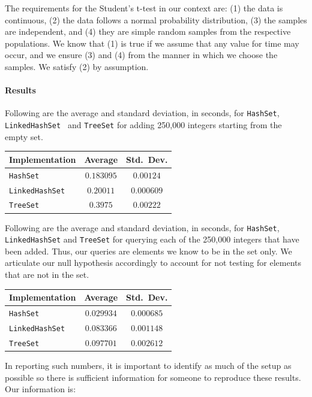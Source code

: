The requirements for the Student's t-test in our context
are: (1) the data is continuous, (2) the data follows a normal
probability distribution, (3) the samples are independent, and
(4) they are simple random samples from the respective populations.
We know that (1) is true if we assume that any value for time may
occur, and we ensure (3) and (4) from the
manner in which we choose the samples. We satisfy (2) by
assumption.

\paragraph{Results} Following are the average and standard
deviation, in seconds, for \texttt{HashSet}, \texttt{LinkedHashSet }
and \texttt{TreeSet} for
adding 250,000 integers starting from the empty set.
\begin{center}
    \begin{tabular}{l|c|c}
	\textbf{Implementation} & \textbf{Average} & \textbf{Std.~Dev.}\\ \hline
	\texttt{HashSet} & $0.183095$ & $0.00124$ \\ \hline
	\texttt{LinkedHashSet} & $0.20011$ & $0.000609$ \\ \hline
	\texttt{TreeSet} & $0.3975$ & $0.00222$ \\
    \end{tabular}
\end{center}

Following are the average and standard
deviation, in seconds, for \texttt{HashSet}, 
\texttt{LinkedHashSet} and \texttt{TreeSet} for
querying each of the 250,000 integers that have been added.
Thus, our queries are elements we know to be in the set only.
We articulate our null hypothesis accordingly to account for
not testing for elements that are not in the set.
\begin{center}
    \begin{tabular}{l|c|c}
	
	\textbf{Implementation} & \textbf{Average} & \textbf{Std.~Dev.}\\ \hline
	\texttt{HashSet} & $0.029934$ & $0.000685$ \\ \hline
	\texttt{LinkedHashSet} & $0.083366$ & $0.001148$ \\ \hline
	\texttt{TreeSet} & $0.097701$ & $0.002612$ \\
    \end{tabular}
\end{center}

In reporting such numbers, it is important to identify as much
of the setup as possible so there is sufficient information
for someone to reproduce these results. Our information is:

